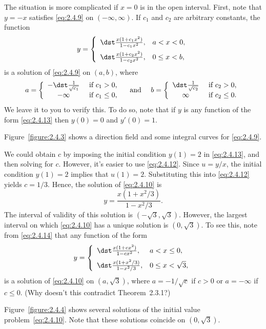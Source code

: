 \begin{examplesolution}
The situation is more complicated if $x=0$ is in the open interval. First, note that $y=-x$ satisfies
\eqref{eq:2.4.9} on $(-\infty,\infty)$. If $c_{1}$ and $c_{2}$ are arbitrary constants, the function
\begin{equation}
  \label{eq:2.4.14}y=\left\{
  \begin{array}{ll}
    \dst\frac{x(1+c_{1}x^{2})}{1-c_{1}x^{2}},        & a<x<0,    \\
    [2\jot]\dst\frac{x(1+c_{2}x^{2})}{1-c_{2}x^{2}}, & 0\le x<b,
  \end{array}\right.
\end{equation}
is a solution of \eqref{eq:2.4.9} on $(a,b)$, where
\[
  a=\left\{
  \begin{array}{cl}
    -\dst\frac{1}{\sqrt{c_{1}}} & \mbox{ if }c_{1}>0,   \\
    -\infty                     & \mbox{ if }c_{1}\le0,
  \end{array}\right.\mbox{\quad and \quad}b=\left\{
  \begin{array}{cl}
    \dst\frac{1}{\sqrt{c_{2}}} & \mbox{ if }c_{2}>0,   \\
    \infty                     & \mbox{ if }c_{2}\le0.
  \end{array}\right.
\]
We leave it to you to verify this. To do so, note that if $y$ is any function of the form
\eqref{eq:2.4.13} then $y(0)=0$ and $y'(0)=1$.

Figure~\ref{figure:2.4.3} shows a direction field and some integral curves for \eqref{eq:2.4.9}.

 We could obtain $c$ by imposing the initial condition $y(1)=2$ in
\eqref{eq:2.4.13}, and then solving for $c$. However, it's easier to use \eqref{eq:2.4.12}. Since
$u=y/x$, the initial condition $y(1)=2$ implies that $u(1)=2$. Substituting this into
\eqref{eq:2.4.12} yields $c=1/3$. Hence, the solution of \eqref{eq:2.4.10} is
\[
  y=\frac{x(1+x^{2}/3)}{1-x^{2}/3}.
\]
The interval of validity of this solution is $(-\sqrt{3},\sqrt{3})$. However, the largest interval
on which \eqref{eq:2.4.10} has a unique solution is $(0,\sqrt{3})$. To see this, note from
\eqref{eq:2.4.14} that any function of the form
\begin{equation}
  \label{eq:2.4.15}y=\left\{
  \begin{array}{ll}
    \dst\frac{x(1+cx^{2})}{1-cx^{2}},   & a<x\le0,         \\[2\jot]
    \dst\frac{x(1+x^{2}/3)}{1-x^{2}/3}, & 0\le x<\sqrt{3},
  \end{array}\right.
\end{equation}
is a solution of \eqref{eq:2.4.10} on $(a,\sqrt{3})$, where $a=-1/\sqrt{c}$ if $c>0$ or $a=-\infty$
if $c\le0$. (Why doesn't this contradict Theorem~2.3.1?)

Figure~\ref{figure:2.4.4} shows several solutions of the initial value problem~\eqref{eq:2.4.10}.
Note that these solutions coincide on $(0,\sqrt{3})$.
\end{examplesolution}

